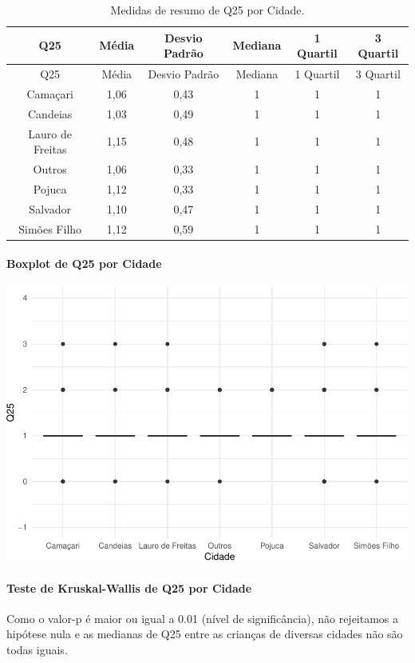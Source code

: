 \documentclass[]{article}
\let\oldparagraph\paragraph
\renewcommand{\paragraph}[1]{\oldparagraph{#1}\mbox{}}
\begin{document}
\begin{longtable}[]{@{}cccccc@{}}
\caption{\label{tab:unnamed-chunk-665}Medidas de resumo de Q25 por Cidade.}\tabularnewline
\toprule
Q25 & Média & Desvio Padrão & Mediana & 1 Quartil & 3 Quartil\tabularnewline
\midrule
\endfirsthead
\toprule
Q25 & Média & Desvio Padrão & Mediana & 1 Quartil & 3 Quartil\tabularnewline
\midrule
\endhead
Camaçari & 1,06 & 0,43 & 1 & 1 & 1\tabularnewline
Candeias & 1,03 & 0,49 & 1 & 1 & 1\tabularnewline
Lauro de Freitas & 1,15 & 0,48 & 1 & 1 & 1\tabularnewline
Outros & 1,06 & 0,33 & 1 & 1 & 1\tabularnewline
Pojuca & 1,12 & 0,33 & 1 & 1 & 1\tabularnewline
Salvador & 1,10 & 0,47 & 1 & 1 & 1\tabularnewline
Simões Filho & 1,12 & 0,59 & 1 & 1 & 1\tabularnewline
\bottomrule
\end{longtable}

\hypertarget{boxplot-de-q25-por-cidade}{%
\paragraph{Boxplot de Q25 por Cidade}\label{boxplot-de-q25-por-cidade}}

\begin{center}\includegraphics[width=0.75\linewidth]{relatorio_covid19_files/figure-latex/unnamed-chunk-666-1} \end{center}

\hypertarget{teste-de-kruskal-wallis-de-q25-por-cidade}{%
\paragraph{Teste de Kruskal-Wallis de Q25 por Cidade}\label{teste-de-kruskal-wallis-de-q25-por-cidade}}

Como o valor-p é maior ou igual a 0.01 (nível de significância), não rejeitamos a hipótese nula e as medianas de Q25 entre as crianças de diversas cidades não são todas iguais.
\end{document}
